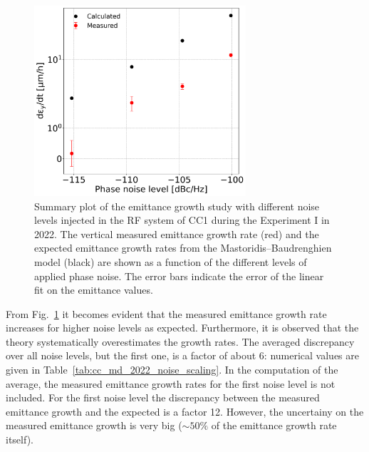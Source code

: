 \begin{figure}[!h]
   \centering         
   \includegraphics[width=0.7\textwidth]{images/Ch8/emit_V_background_subtracted_noise_scan_final.png}
       \caption{Summary plot of the emittance growth study with different noise levels injected in the RF system of CC1 during the Experiment I in 2022. The vertical measured emittance growth rate (red) and the expected emittance growth rates from the Mastoridis--Baudrenghien model (black) are shown as a function of the different levels of applied phase noise. The error bars indicate the error of the linear fit on the emittance values.}
       \label{fig:V_emit_growth_background_subtracted_noise_scan}
\end{figure}

From Fig.~\ref{fig:V_emit_growth_background_subtracted_noise_scan} it becomes evident that the measured emittance growth rate increases for higher noise levels as expected. Furthermore, it is observed that the theory systematically overestimates the growth rates. The averaged discrepancy over all noise levels, but the first one, is a factor of about 6: numerical values are given in Table~\ref{tab:cc_md_2022_noise_scaling}. In the computation of the average, the measured emittance growth rates for the first noise level is not included. For the first noise level the discrepancy between the measured emittance growth and the expected is a factor 12. However, the uncertainy on the measured emittance growth is very big ($\sim 50\%$ of the emittance growth rate itself).

